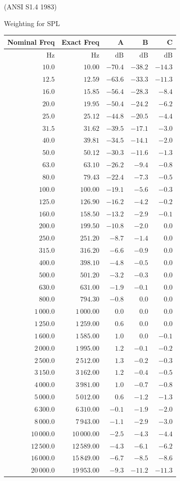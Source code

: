 \documentclass[
]{book}
\begin{document}
(ANSI S1.4 1983)

Weighting for SPL

\begin{longtable}[]{@{}rrrrr@{}}
\toprule
Nominal Freq & Exact Freq & A & B & C\tabularnewline
\midrule
\endhead
\(\text{Hz}\) & \(\text{Hz}\) & \(\text{dB}\) & \(\text{dB}\) & \(\text{dB}\)\tabularnewline
\(10.0\) & \(10.00\) & \(-70.4\) & \(-38.2\) & \(-14.3\)\tabularnewline
\(12.5\) & \(12.59\) & \(-63.6\) & \(-33.3\) & \(-11.3\)\tabularnewline
\(16.0\) & \(15.85\) & \(-56.4\) & \(-28.3\) & \(-8.4\)\tabularnewline
\(20.0\) & \(19.95\) & \(-50.4\) & \(-24.2\) & \(-6.2\)\tabularnewline
\(25.0\) & \(25.12\) & \(-44.8\) & \(-20.5\) & \(-4.4\)\tabularnewline
\(31.5\) & \(31.62\) & \(-39.5\) & \(-17.1\) & \(-3.0\)\tabularnewline
\(40.0\) & \(39.81\) & \(-34.5\) & \(-14.1\) & \(-2.0\)\tabularnewline
\(50.0\) & \(50.12\) & \(-30.3\) & \(-11.6\) & \(-1.3\)\tabularnewline
\(63.0\) & \(63.10\) & \(-26.2\) & \(-9.4\) & \(-0.8\)\tabularnewline
\(80.0\) & \(79.43\) & \(-22.4\) & \(-7.3\) & \(-0.5\)\tabularnewline
\(100.0\) & \(100.00\) & \(-19.1\) & \(-5.6\) & \(-0.3\)\tabularnewline
\(125.0\) & \(126.90\) & \(-16.2\) & \(-4.2\) & \(-0.2\)\tabularnewline
\(160.0\) & \(158.50\) & \(-13.2\) & \(-2.9\) & \(-0.1\)\tabularnewline
\(200.0\) & \(199.50\) & \(-10.8\) & \(-2.0\) & \(0.0\)\tabularnewline
\(250.0\) & \(251.20\) & \(-8.7\) & \(-1.4\) & \(0.0\)\tabularnewline
\(315.0\) & \(316.20\) & \(-6.6\) & \(-0.9\) & \(0.0\)\tabularnewline
\(400.0\) & \(398.10\) & \(-4.8\) & \(-0.5\) & \(0.0\)\tabularnewline
\(500.0\) & \(501.20\) & \(-3.2\) & \(-0.3\) & \(0.0\)\tabularnewline
\(630.0\) & \(631.00\) & \(-1.9\) & \(-0.1\) & \(0.0\)\tabularnewline
\(800.0\) & \(794.30\) & \(-0.8\) & \(0.0\) & \(0.0\)\tabularnewline
\(1\,000.0\) & \(1\,000.00\) & \(0.0\) & \(0.0\) & \(0.0\)\tabularnewline
\(1\,250.0\) & \(1\,259.00\) & \(0.6\) & \(0.0\) & \(0.0\)\tabularnewline
\(1\,600.0\) & \(1\,585.00\) & \(1.0\) & \(0.0\) & \(-0.1\)\tabularnewline
\(2\,000.0\) & \(1\,995.00\) & \(1.2\) & \(-0.1\) & \(-0.2\)\tabularnewline
\(2\,500.0\) & \(2\,512.00\) & \(1.3\) & \(-0.2\) & \(-0.3\)\tabularnewline
\(3\,150.0\) & \(3\,162.00\) & \(1.2\) & \(-0.4\) & \(-0.5\)\tabularnewline
\(4\,000.0\) & \(3\,981.00\) & \(1.0\) & \(-0.7\) & \(-0.8\)\tabularnewline
\(5\,000.0\) & \(5\,012.00\) & \(0.6\) & \(-1.2\) & \(-1.3\)\tabularnewline
\(6\,300.0\) & \(6\,310.00\) & \(-0.1\) & \(-1.9\) & \(-2.0\)\tabularnewline
\(8\,000.0\) & \(7\,943.00\) & \(-1.1\) & \(-2.9\) & \(-3.0\)\tabularnewline
\(10\,000.0\) & \(10\,000.00\) & \(-2.5\) & \(-4.3\) & \(-4.4\)\tabularnewline
\(12\,500.0\) & \(12\,589.00\) & \(-4.3\) & \(-6.1\) & \(-6.2\)\tabularnewline
\(16\,000.0\) & \(15\,849.00\) & \(-6.7\) & \(-8.5\) & \(-8.6\)\tabularnewline
\(20\,000.0\) & \(19\,953.00\) & \(-9.3\) & \(-11.2\) & \(-11.3\)\tabularnewline
\bottomrule
\end{longtable}
\end{document}
